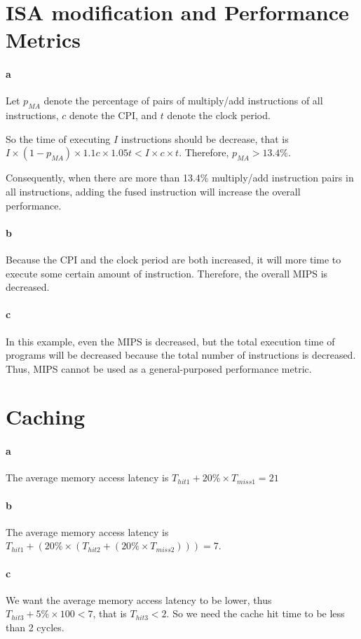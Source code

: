 \documentclass[12pt,letterpaper]{article}
\begin{document}
\section{ISA modification and Performance Metrics}
\paragraph*{a}
Let $p_{MA}$ denote the percentage of pairs of multiply/add instructions of all
instructions, $c$ denote the CPI, and $t$ denote the clock period.

So the time of executing $I$ instructions should be decrease, that is 
$I\times(1-p_{MA})\times1.1c\times1.05t < I \times c \times t$. Therefore,
$p_{MA}>13.4\%$.

Consequently, when there are more than 13.4\% multiply/add instruction pairs
in all instructions, adding the fused instruction will increase the overall 
performance.

\paragraph*{b}
Because the CPI and the clock period are both increased, it will more time to 
execute some certain amount of instruction. Therefore, the overall MIPS is
decreased.

\paragraph*{c}
In this example, even the MIPS is decreased, but the total execution time of
programs will be decreased because the total number of instructions is 
decreased. Thus, MIPS cannot be used as a general-purposed performance
metric.

\section{Caching}
\paragraph*{a}
The average memory access latency is $T_{hit1} + 20\%\times T_{miss1} = 21$

\paragraph*{b}
The average memory access latency is $T_{hit1} + (20\%\times (T_{hit2} +
(20\%\times T_{miss2}))) = 7$.

\paragraph*{c}
We want the average memory access latency to be lower, thus $T_{hit3} + 5\%
\times 100 < 7$, that is $T_{hit3} < 2$. So we need the cache hit time to be
less than 2 cycles.
\end{document}
